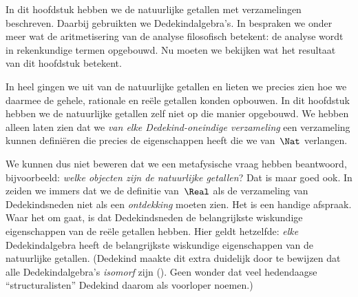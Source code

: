 \documentclass[openany]{memoir}
\begin{document}
\begingroup
\def\olfilename{OLP-0053}
\def\olfilepath{content/sets-functions-relations/infinite/}
\hypertarget{unit-OLP-0053}{}
%




In dit hoofdstuk hebben we de natuurlijke getallen met verzamelingen
beschreven. Daarbij gebruikten we Dedekindalgebra's. In
 bespraken we onder meer wat de aritmetisering
van de analyse filosofisch betekent: de analyse wordt in rekenkundige
termen opgebouwd. Nu moeten we bekijken wat het resultaat van dit
hoofdstuk betekent.

In heel  gingen we uit van de natuurlijke
getallen en lieten we precies zien hoe we daarmee de gehele, rationale
en reële getallen konden opbouwen. In dit hoofdstuk hebben we de
natuurlijke getallen zelf niet op die manier opgebouwd. We hebben
alleen laten zien dat we \emph{van elke Dedekind-oneindige verzameling}
een verzameling kunnen definiëren die precies de eigenschappen heeft die
we van~$\Nat$ verlangen.

We kunnen dus niet beweren dat we een metafysische vraag hebben
beantwoord, bijvoorbeeld: \emph{welke objecten zijn de natuurlijke
getallen}? Dat is maar goed ook. In
 zeiden we immers dat we de definitie
van~$\Real$ als de verzameling van Dedekindsneden niet als een
\emph{ontdekking} moeten zien. Het is een handige afspraak. Waar het om
gaat, is dat Dedekindsneden de belangrijkste wiskundige eigenschappen
van de reële getallen hebben. Hier geldt hetzelfde: \emph{elke}
Dedekindalgebra heeft de belangrijkste wiskundige eigenschappen van de
natuurlijke getallen. (Dedekind maakte dit extra duidelijk door te
bewijzen dat alle Dedekindalgebra's \emph{isomorf} zijn
(\citeyear[stellingen 132--3]{Dedekind1888}). Geen wonder dat veel
hedendaagse ``structuralisten'' Dedekind daarom als voorloper noemen.)
\end{document}
